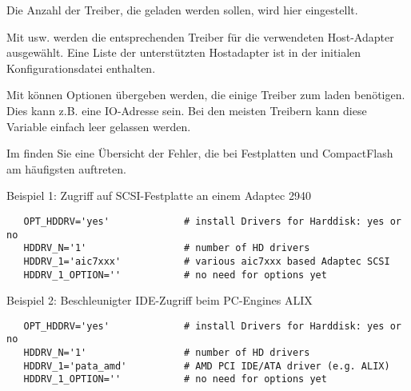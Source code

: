 \begin{description}
{
	Die Anzahl der Treiber, die geladen werden sollen, wird hier eingestellt.
}

{
        Mit  usw. werden die entsprechenden Treiber für die
        verwendeten Host-Adapter ausgewählt. Eine Liste der unterstützten
        Hostadapter ist in der initialen Konfigurationsdatei enthalten.
}

{
        Mit  können Optionen übergeben werden, die einige Treiber
        zum laden benötigen. Dies kann z.B. eine IO-Adresse sein.
        Bei den meisten Treibern kann diese Variable einfach leer gelassen werden.
}

    Im  finden Sie eine Übersicht der Fehler, die
    bei Festplatten und CompactFlash am häufigsten auftreten.

    Beispiel 1: Zugriff auf SCSI-Festplatte an einem Adaptec 2940

\begin{example}
\begin{verbatim}
   OPT_HDDRV='yes'             # install Drivers for Harddisk: yes or no
   HDDRV_N='1'                 # number of HD drivers
   HDDRV_1='aic7xxx'           # various aic7xxx based Adaptec SCSI 
   HDDRV_1_OPTION=''           # no need for options yet
\end{verbatim}
\end{example}

    Beispiel 2: Beschleunigter IDE-Zugriff beim PC-Engines ALIX

\begin{example}
\begin{verbatim}
   OPT_HDDRV='yes'             # install Drivers for Harddisk: yes or no
   HDDRV_N='1'                 # number of HD drivers
   HDDRV_1='pata_amd'          # AMD PCI IDE/ATA driver (e.g. ALIX) 
   HDDRV_1_OPTION=''           # no need for options yet
\end{verbatim}
\end{example}

\end{description}
